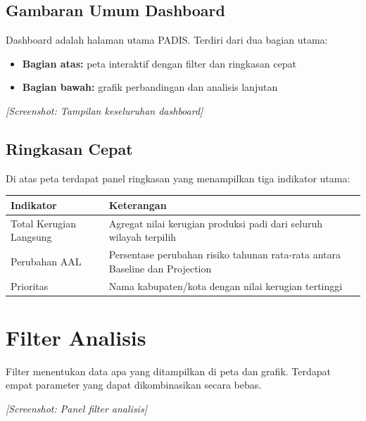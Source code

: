 \documentclass[12pt, a4paper]{article}
\newcommand{\screenshot}[1]{%
    \begin{center}
      \begin{tcolorbox}[
        enhanced,
        colback  = sectiongray,
        colframe = padisborder,
        arc      = 6pt,
        boxrule  = 0.6pt,
        height   = 5.5cm,
        valign   = center,
        halign   = center,
        fontupper = \sffamily\small\color{padismuted},
      ]
        \textit{[Screenshot: #1]}
      \end{tcolorbox}
    \end{center}%
  }
\begin{document}
  \subsection{Gambaran Umum Dashboard}

  Dashboard adalah halaman utama PADIS. Terdiri dari dua bagian utama:
  \begin{itemize}
    \item \textbf{Bagian atas:} peta interaktif dengan filter dan ringkasan cepat
    \item \textbf{Bagian bawah:} grafik perbandingan dan analisis lanjutan
  \end{itemize}

  \screenshot{Tampilan keseluruhan dashboard}

  \subsection{Ringkasan Cepat}

  Di atas peta terdapat panel ringkasan yang menampilkan tiga indikator utama:

  \begin{center}
  \begin{tabularx}{0.9\textwidth}{@{} l X @{}}
    \toprule
    \textbf{Indikator}      & \textbf{Keterangan} \\
    \midrule
    Total Kerugian Langsung & Agregat nilai kerugian produksi padi dari seluruh wilayah terpilih \\
    Perubahan AAL           & Persentase perubahan risiko tahunan rata-rata antara Baseline dan Projection \\
    Prioritas               & Nama kabupaten/kota dengan nilai kerugian tertinggi \\
    \bottomrule
  \end{tabularx}
  \end{center}

  \newpage

  \section{Filter Analisis}

  Filter menentukan data apa yang ditampilkan di peta dan grafik. Terdapat empat parameter
  yang dapat dikombinasikan secara bebas.

  \screenshot{Panel filter analisis}
\end{document}
